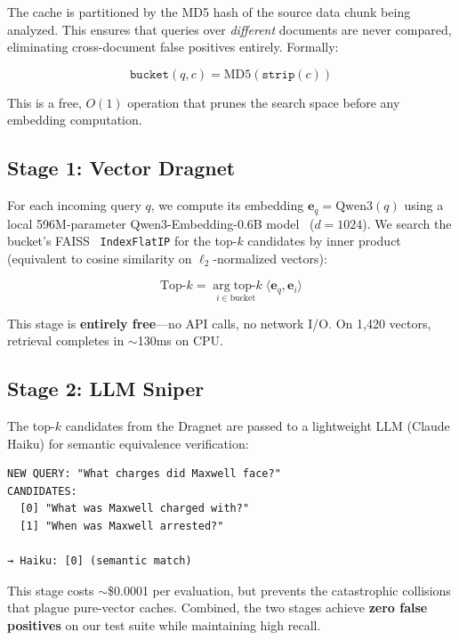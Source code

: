 \documentclass[11pt,twocolumn]{article}
\begin{document}
The cache is partitioned by the MD5 hash of the source data chunk being analyzed. This ensures that queries over \textit{different} documents are never compared, eliminating cross-document false positives entirely. Formally:

$$\texttt{bucket}(q, c) = \text{MD5}(\texttt{strip}(c))$$

This is a free, $O(1)$ operation that prunes the search space before any embedding computation.

\subsection{Stage 1: Vector Dragnet}
\label{sec:dragnet}

For each incoming query $q$, we compute its embedding $\mathbf{e}_q = \text{Qwen3}(q)$ using a local 596M-parameter Qwen3-Embedding-0.6B model~\cite{qwen3} ($d = 1024$). We search the bucket's FAISS~\cite{johnson2019billion} \texttt{IndexFlatIP} for the top-$k$ candidates by inner product (equivalent to cosine similarity on $\ell_2$-normalized vectors):

$$\text{Top-}k = \underset{i \in \text{bucket}}{\arg\text{top-}k}\; \langle \mathbf{e}_q, \mathbf{e}_i \rangle$$

This stage is \textbf{entirely free}---no API calls, no network I/O. On 1,420 vectors, retrieval completes in $\sim$130ms on CPU.

\subsection{Stage 2: LLM Sniper}
\label{sec:sniper}

The top-$k$ candidates from the Dragnet are passed to a lightweight LLM (Claude Haiku) for semantic equivalence verification:

\begin{small}
\begin{verbatim}
NEW QUERY: "What charges did Maxwell face?"
CANDIDATES:
  [0] "What was Maxwell charged with?"
  [1] "When was Maxwell arrested?"

→ Haiku: [0] (semantic match)
\end{verbatim}
\end{small}

This stage costs $\sim$\$0.0001 per evaluation, but prevents the catastrophic collisions that plague pure-vector caches. Combined, the two stages achieve \textbf{zero false positives} on our test suite while maintaining high recall.
\end{document}
